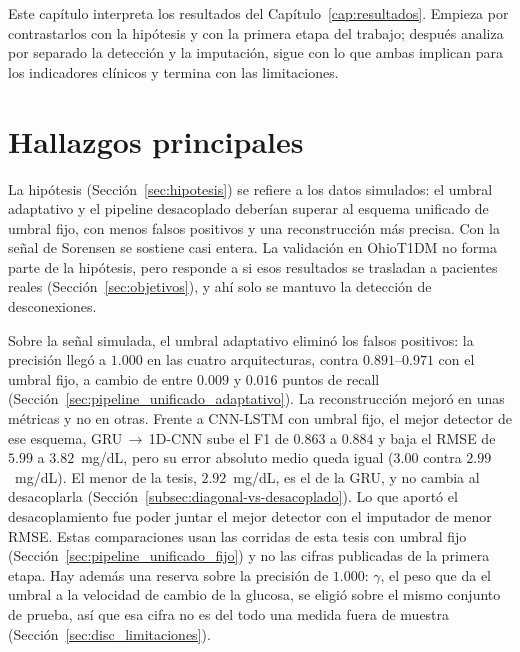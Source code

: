 \documentclass{report}
\begin{document}
Este capítulo interpreta los resultados del Capítulo~\ref{cap:resultados}. Empieza por contrastarlos con la hipótesis y con la primera etapa del trabajo; después analiza por separado la detección y la imputación, sigue con lo que ambas implican para los indicadores clínicos y termina con las limitaciones.

\section{Hallazgos principales}
\label{sec:disc_hallazgos}
 
La hipótesis (Sección~\ref{sec:hipotesis}) se refiere a los datos simulados: el umbral adaptativo y el pipeline desacoplado deberían superar al esquema unificado de umbral fijo, con menos falsos positivos y una reconstrucción más precisa. Con la señal de Sorensen se sostiene casi entera. La validación en OhioT1DM no forma parte de la hipótesis, pero responde a si esos resultados se trasladan a pacientes reales (Sección~\ref{sec:objetivos}), y ahí solo se mantuvo la detección de desconexiones.
 
Sobre la señal simulada, el umbral adaptativo eliminó los falsos positivos: la precisión llegó a $1.000$ en las cuatro arquitecturas, contra $0.891$--$0.971$ con el umbral fijo, a cambio de entre $0.009$ y $0.016$ puntos de recall (Sección~\ref{sec:pipeline_unificado_adaptativo}). La reconstrucción mejoró en unas métricas y no en otras. Frente a CNN-LSTM con umbral fijo, el mejor detector de ese esquema, GRU\,$\rightarrow$\,1D-CNN sube el F1 de $0.863$ a $0.884$ y baja el RMSE de $5.99$ a $3.82$~mg/dL, pero su error absoluto medio queda igual ($3.00$ contra $2.99$~mg/dL). El menor de la tesis, $2.92$~mg/dL, es el de la GRU, y no cambia al desacoplarla (Sección~\ref{subsec:diagonal-vs-desacoplado}). Lo que aportó el desacoplamiento fue poder juntar el mejor detector con el imputador de menor RMSE. Estas comparaciones usan las corridas de esta tesis con umbral fijo (Sección~\ref{sec:pipeline_unificado_fijo}) y no las cifras publicadas de la primera etapa. Hay además una reserva sobre la precisión de $1.000$: $\gamma$, el peso que da el umbral a la velocidad de cambio de la glucosa, se eligió sobre el mismo conjunto de prueba, así que esa cifra no es del todo una medida fuera de muestra (Sección~\ref{sec:disc_limitaciones}).
 
\end{document}
